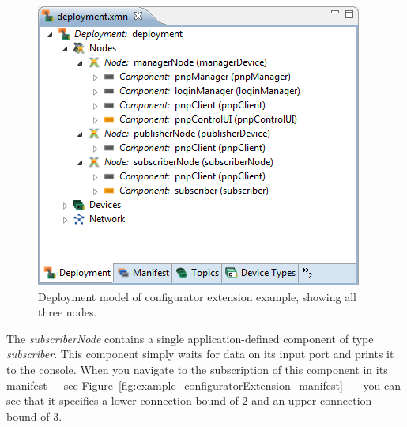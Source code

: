 \begin{figure}[htpb]
	\centering
	\includegraphics[scale=0.8]{figures/example_configuratorExtension_deployment.png}
	\caption{Deployment model of configurator extension example, showing all three nodes.}
	\label{fig:example_configuratorExtension_deployment}
\end{figure}

The \textit{subscriberNode} contains a single application-defined component of type \textit{subscriber}.
This component simply waits for data on its input port and prints it to the console.
When you navigate to the subscription of this component in its manifest~--~see Figure~\ref{fig:example_configuratorExtension_manifest}~--~%
you can see that it specifies a lower connection bound of $2$ and an upper connection
bound of $3$.

